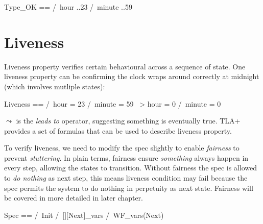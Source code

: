 \documentclass{report}
\begin{document}
\begin{tla}
    Type_OK == 
        /\ hour ..23
        /\ minute ..59
\end{tla}
\begin{tlatex}
%
%
%
\end{tlatex}

\section{Liveness}

Liveness property verifies certain behavioural across a sequence of state. One
liveness property can be confirming the clock wraps around correctly at
midnight (which involves mutliple states): \newline

\begin{tla}
    Liveness ==
        /\ hour = 23 /\ minute = 59 ~> hour = 0 /\ minute = 0
\end{tla}
\begin{tlatex}
%
\end{tlatex}
\newline

$\leadsto$ is the \textit{leads to} operator, suggesting something is eventually
true. TLA+ provides a set of formulas that can be used to describe liveness
property.\newline 

To verify liveness, we need to modify the spec slightly to enable
\textit{fairness} to prevent \textit{stuttering}. In plain terms, fairness
ensure \textit{something} always happen in every step, allowing the states to
transition. Without fairness the spec is allowed to \textit{do nothing} as next
step, this means liveness condition may fail because the spec permits the system
to do nothing in perpetuity as next state. Fairness will be covered in more
detailed in later chapter.\newline

\begin{tla}
    Spec ==
        /\ Init
        /\ [][Next]_vars
        /\ WF_vars(Next)
\end{tla}
\begin{tlatex}
%
%
%
%
\end{tlatex}
\newline
\end{document}
